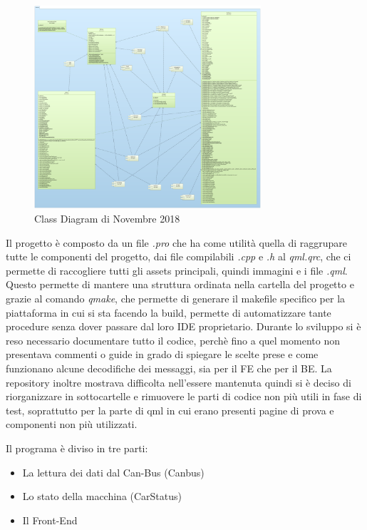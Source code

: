 \begin{figure}[hbt!]
    \centering
    \includegraphics[width=0.75\textwidth]{./figures/cd.pdf}
    \caption{Class Diagram di Novembre 2018}
\end{figure}

Il progetto è composto da un file \emph{.pro} che ha come utilità quella di raggrupare tutte le componenti
del progetto, dai file compilabili \emph{.cpp} e \emph{.h} al \emph{qml.qrc}, che ci permette di raccogliere 
tutti gli assets principali, quindi immagini e i file \emph{.qml}.
Questo permette di mantere una struttura ordinata nella cartella del progetto e grazie al comando \emph{qmake},
che permette di generare il makefile specifico per la piattaforma in cui si sta facendo la build, permette di automatizzare 
tante procedure senza dover passare dal loro IDE proprietario. 
Durante lo sviluppo si è reso necessario documentare tutto il codice, perchè fino a quel momento non presentava commenti 
o guide in grado di spiegare le scelte prese e come funzionano alcune decodifiche dei messaggi, sia per il FE che per il BE. 
La repository inoltre mostrava difficolta nell'essere mantenuta quindi si è deciso di riorganizzare in sottocartelle e 
rimuovere le parti di codice non più utili in fase di test, soprattutto per la parte di qml in cui erano presenti pagine di prova e componenti
non più utilizzati.  

Il programa è diviso in tre parti:

\begin{itemize}
    \item La lettura dei dati dal Can-Bus (Canbus) 
    \item Lo stato della macchina (CarStatus)
    \item Il Front-End
\end{itemize}

